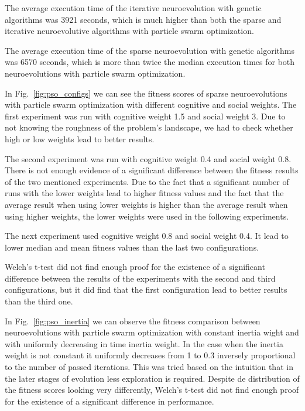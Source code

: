 \documentclass[conference]{IEEEtran}
\begin{document}
The average execution time of the iterative neuroevolution with genetic algorithms was 3921 seconds, which is much
higher than both the sparse and iterative neuroevolutive algorithms with particle swarm optimization.

The average execution time of the sparse neuroevolution with genetic algorithms was 6570 seconds,
which is more than twice the median execution times for both neuroevolutions with particle swarm optimization.


In Fig.~\ref{fig:pso_configs} we can see the fitness scores of sparse neuroevolutions with particle swarm optimization
with different cognitive and social weights.
The first experiment was run with cognitive weight 1.5 and social weight 3.
Due to not knowing the roughness of the problem's landscape, we had to check whether high or low weights lead to better results.

The second experiment was run with cognitive weight 0.4 and social weight 0.8.
There is not enough evidence of a significant difference between the fitness results of the two mentioned experiments.
Due to the fact that a significant number of runs with the lower weights lead to higher fitness values and the fact that the
average result when using lower weights is higher than the average result when using higher weights, the lower
weights were used in the following experiments.

The next experiment used cognitive weight 0.8 and social weight 0.4.
It lead to lower median and mean fitness values than the last two configurations.

Welch's t-test did not find enough proof for the existence of a significant difference between the
results of the experiments with the second and third configurations, but it did find that the first configuration
lead to better results than the third one.

In Fig.~\ref{fig:pso_inertia} we can observe the fitness comparison between neuroevolutions with particle swarm
optimization with constant inertia wight and with uniformly decreasing in time inertia weight.
In the case when the inertia weight is not constant it uniformly decreases from 1 to 0.3 inversely proportional
to the number of passed iterations.
This was tried based on the intuition that in the later stages of evolution less exploration is required.
Despite de distribution of the fitness scores looking very differently, Welch's t-test did not
find enough proof for the existence of a significant difference in performance.
\end{document}
